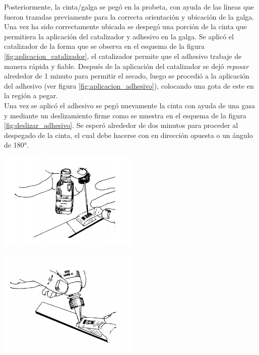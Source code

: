 Posteriormente, la cinta/galga se pegó en la probeta, con ayuda de las líneas que fueron trazadas previamente 
para la correcta orientación y ubicación de la galga. Una vez ha sido correctamente ubicada se despegó una porción 
de la cinta que permitiera la aplicación del catalizador y adhesivo en la galga. Se aplicó el catalizador 
de la forma que se observa en el esquema de la figura \ref{fig:aplicacion_catalizador}, el catalizador permite 
que el adhesivo trabaje de manera rápida y fiable. Después de la aplicación del catalizador se dejó 
\textit{reposar} alrededor de 1 minuto para permitir el secado, luego se procedió a la aplicación del 
adhesivo (ver figura \ref{fig:aplicacion_adhesivo}), colocando una gota de este en la región a pegar.\\

Una vez se aplicó el adhesivo se pegó nuevamente la cinta con ayuda de una gasa y mediante un deslizamiento firme 
como se muestra en el esquema de la figura \ref{fig:deslizar_adhesivo}. Se esperó alrededor 
de dos minutos para proceder al despegado de la cinta, el cual debe hacerse con en dirección opuesta 
o un ángulo de 180°.

\begin{center}
\includegraphics[width=0.5\textwidth]{src/ch3/aplicacion_catalizador.png}
\label{fig:aplicacion_catalizador}
\end{center}

\begin{center}
\includegraphics[width=0.5\textwidth]{src/ch3/aplicacion_adhesivo.png}
\label{fig:aplicacion_adhesivo}
\end{center}

